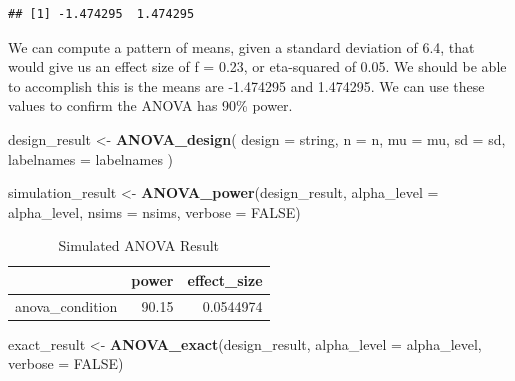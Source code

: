 \documentclass[]{book}
\newenvironment{Shaded}{\begin{snugshade}}{\end{snugshade}}
\newcommand{\DataTypeTok}[1]{\textcolor[rgb]{0.13,0.29,0.53}{#1}}
\newcommand{\KeywordTok}[1]{\textcolor[rgb]{0.13,0.29,0.53}{\textbf{#1}}}
\newcommand{\NormalTok}[1]{#1}
\newcommand{\OtherTok}[1]{\textcolor[rgb]{0.56,0.35,0.01}{#1}}
\newcommand{\StringTok}[1]{\textcolor[rgb]{0.31,0.60,0.02}{#1}}
\begin{document}
\begin{verbatim}
## [1] -1.474295  1.474295
\end{verbatim}

We can compute a pattern of means, given a standard deviation of 6.4, that would give us an effect size of f = 0.23, or eta-squared of 0.05. We should be able to accomplish this is the means are -1.474295 and 1.474295. We can use these values to confirm the ANOVA has 90\% power.

\begin{Shaded}
\begin{Highlighting}[]
\NormalTok{design_result <-}\StringTok{ }\KeywordTok{ANOVA_design}\NormalTok{(}
  \DataTypeTok{design =}\NormalTok{ string,}
  \DataTypeTok{n =}\NormalTok{ n,}
  \DataTypeTok{mu =}\NormalTok{ mu,}
  \DataTypeTok{sd =}\NormalTok{ sd,}
  \DataTypeTok{labelnames =}\NormalTok{ labelnames}
\NormalTok{  )}
\end{Highlighting}
\end{Shaded}

\begin{Shaded}
\begin{Highlighting}[]
\NormalTok{simulation_result <-}\StringTok{ }\KeywordTok{ANOVA_power}\NormalTok{(design_result, }
                                 \DataTypeTok{alpha_level =}\NormalTok{ alpha_level, }
                                 \DataTypeTok{nsims =}\NormalTok{ nsims,}
                                 \DataTypeTok{verbose =} \OtherTok{FALSE}\NormalTok{)}
\end{Highlighting}
\end{Shaded}

\begin{table}[t]

\caption{\label{tab:unnamed-chunk-19}Simulated ANOVA Result}
\centering
\begin{tabular}{l|r|r}
\hline
  & power & effect\_size\\
\hline
anova\_condition & 90.15 & 0.0544974\\
\hline
\end{tabular}
\end{table}

\begin{Shaded}
\begin{Highlighting}[]
\NormalTok{exact_result <-}\StringTok{ }\KeywordTok{ANOVA_exact}\NormalTok{(design_result,}
                            \DataTypeTok{alpha_level =}\NormalTok{ alpha_level,}
                            \DataTypeTok{verbose =} \OtherTok{FALSE}\NormalTok{)}
\end{Highlighting}
\end{Shaded}
\end{document}
